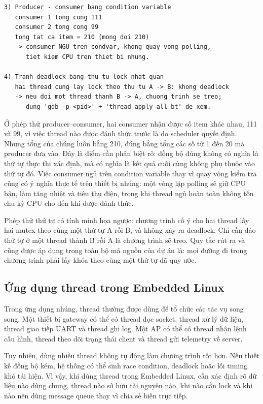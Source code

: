 \documentclass[11pt]{article}
\begin{document}
\begin{lstlisting}[caption={Producer--consumer bằng condition variable và thứ tự lock nhất quán}]
3) Producer - consumer bang condition variable
   consumer 1 tong cong 111
   consumer 2 tong cong 99
   tong tat ca item = 210 (mong doi 210)
   -> consumer NGU tren condvar, khong quay vong polling,
      tiet kiem CPU tren thiet bi nhung.

4) Tranh deadlock bang thu tu lock nhat quan
   hai thread cung lay lock theo thu tu A -> B: khong deadlock
   -> neu doi mot thread thanh B -> A, chuong trinh se treo;
      dung 'gdb -p <pid>' + 'thread apply all bt' de xem.
\end{lstlisting}

Ở phép thử producer--consumer, hai consumer nhận được số item khác nhau, 111 và 99, vì việc thread nào được đánh thức trước là do scheduler quyết định. Nhưng tổng của chúng luôn bằng 210, đúng bằng tổng các số từ 1 đến 20 mà producer đưa vào. Đây là điểm cần phân biệt rõ: đồng bộ đúng không có nghĩa là thứ tự thực thi xác định, mà có nghĩa là kết quả cuối cùng không phụ thuộc vào thứ tự đó. Việc consumer ngủ trên condition variable thay vì quay vòng kiểm tra cũng có ý nghĩa thực tế trên thiết bị nhúng: một vòng lặp polling sẽ giữ CPU bận, làm tăng nhiệt và tiêu thụ điện, trong khi thread ngủ hoàn toàn không tốn chu kỳ CPU cho đến khi được đánh thức.

Phép thử thứ tư có tính minh họa ngược: chương trình cố ý cho hai thread lấy hai mutex theo cùng một thứ tự A rồi B, và không xảy ra deadlock. Chỉ cần đảo thứ tự ở một thread thành B rồi A là chương trình sẽ treo. Quy tắc rút ra và cũng được áp dụng trong toàn bộ mã nguồn của dự án là: mọi đường đi trong chương trình phải lấy khóa theo cùng một thứ tự đã quy ước.

\subsection{Ứng dụng thread trong Embedded Linux}

Trong ứng dụng nhúng, thread thường được dùng để tổ chức các tác vụ song song. Một thiết bị gateway có thể có thread đọc socket, thread xử lý dữ liệu, thread giao tiếp UART và thread ghi log. Một AP có thể có thread nhận lệnh cấu hình, thread theo dõi trạng thái client và thread gửi telemetry về server.

Tuy nhiên, dùng nhiều thread không tự động làm chương trình tốt hơn. Nếu thiết kế đồng bộ kém, hệ thống có thể sinh race condition, deadlock hoặc lỗi timing khó tái hiện. Vì vậy, khi dùng thread trong Embedded Linux, cần xác định rõ dữ liệu nào dùng chung, thread nào sở hữu tài nguyên nào, khi nào cần lock và khi nào nên dùng message queue thay vì chia sẻ biến trực tiếp.
\end{document}
